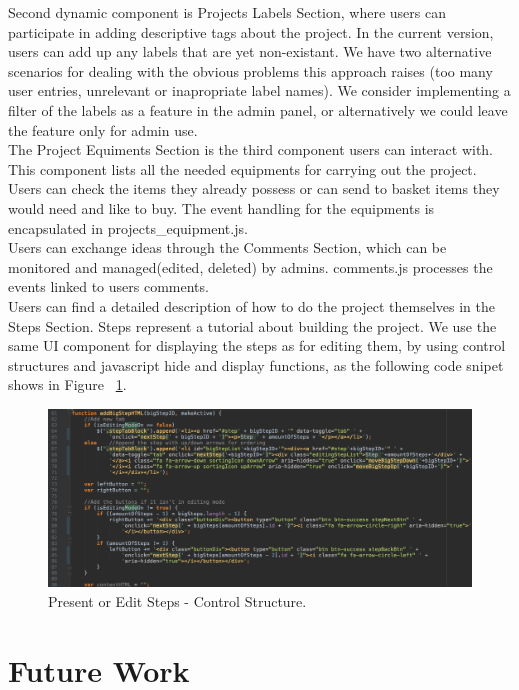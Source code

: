 Second dynamic component is Projects Labels Section, where users can participate in adding descriptive tags about the project. In the current version, users can add up any labels that are yet non-existant. We have two alternative scenarios for dealing with the obvious problems this approach raises (too many user entries, unrelevant or inapropriate label names). We consider implementing a filter of the labels as a feature in the admin panel, or alternatively we could leave the feature only for admin use. \\

The Project Equiments Section is the third component users can interact with. This component lists all the needed equipments for carrying out the project. Users can check the items they already possess or can send to basket items they would need and like to buy. The event handling for the equipments is encapsulated in projects\_equipment.js. \\

Users can exchange ideas through the Comments Section, which can be monitored and managed(edited, deleted) by admins. comments.js processes the events linked to users comments.\\

Users can find a detailed description of how to do the project themselves in the Steps Section. Steps represent a tutorial about building the project. We use the same UI component for displaying the steps as for editing them, by using control structures and javascript hide and display functions, as the following code snipet shows in Figure ~\ref{fig:edit_present_steps}. 

\begin{figure}
\includegraphics[width=1\linewidth]{images/stepsEdit&Present.png}
\caption{Present or Edit Steps - Control Structure.}
\label{fig:edit_present_steps}
\end{figure}	


\chapter{Future Work}

